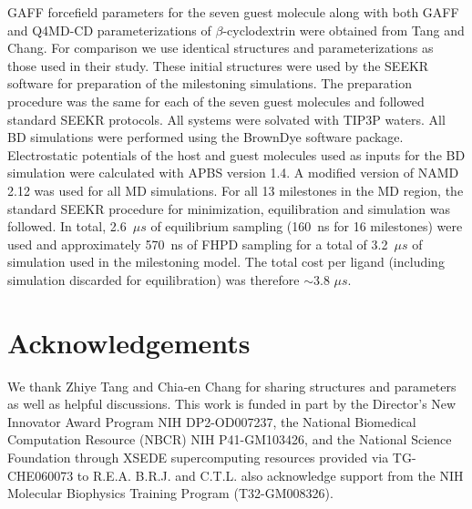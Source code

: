 \par GAFF\cite{Wang2004,Wang2006} forcefield parameters for the seven guest molecule
along with both GAFF and Q4MD-CD\cite{Cezard2011} parameterizations of $\beta$-cyclodextrin
were obtained from Tang and Chang\cite{Tang2017}. For comparison we use identical structures and
parameterizations as those used in their study. These initial structures were
used by the SEEKR software for preparation of the milestoning simulations.
The preparation procedure was the same for each of the seven guest molecules and
followed standard SEEKR protocols\cite{Votapka2017}. All systems were solvated
with TIP3P waters\cite{Jorgensen1983a}. All BD simulations were performed using the BrownDye software package\cite{Huber2010}.
Electrostatic potentials of the host and guest molecules used as inputs for the
BD simulation were calculated with APBS version 1.4\cite{Baker2001}.
A modified version of NAMD 2.12 was used for all MD simulations\cite{Phillips2005}.
For all 13 milestones in the MD region, the standard SEEKR procedure for
minimization, equilibration and simulation was followed. In total, 2.6~${\mu}s$ of equilibrium sampling (160~ns for 16 milestones) were
used and approximately 570~ns of FHPD sampling for a total of 3.2~${\mu}s$ of
simulation used in the milestoning model. The total cost per ligand (including
simulation discarded for equilibration) was therefore $\sim$3.8 ${\mu}s$.  \

\section*{Acknowledgements}
We thank Zhiye Tang and Chia-en Chang for sharing structures and parameters as
well as helpful discussions. This work is funded in part by the Director's
New Innovator Award Program NIH DP2-OD007237, the National Biomedical Computation
Resource (NBCR) NIH P41-GM103426, and the National Science Foundation through
XSEDE supercomputing resources provided via TG-CHE060073 to R.E.A. B.R.J.
and C.T.L. also acknowledge support from the NIH Molecular Biophysics
Training Program (T32-GM008326).

% 

